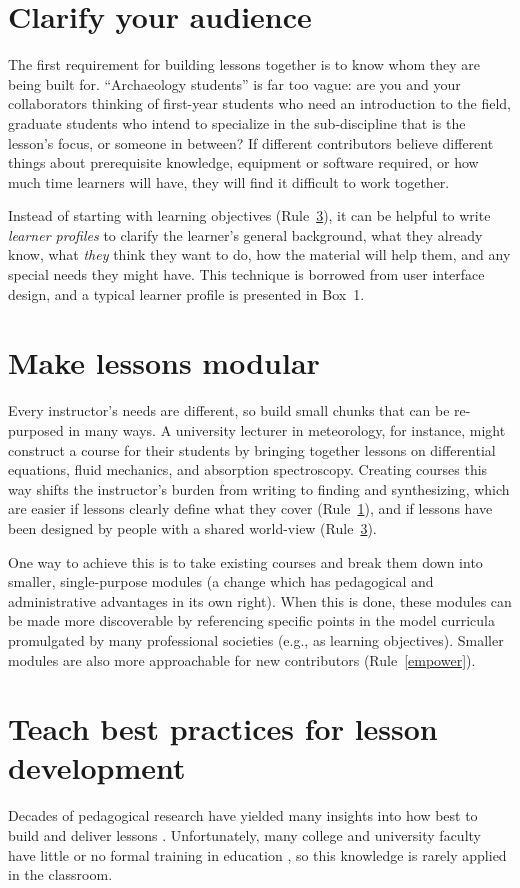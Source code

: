 \documentclass[10pt,letterpaper]{article}
\newcommand{\rulemajor}[2]{\section{#1}\label{#2}}
\newcommand{\ruleref}[1]{Rule~\ref{#1}}
\begin{document}
\rulemajor{Clarify your audience}{audience}

The first requirement for building lessons together is
to know whom they are being built for.
``Archaeology students'' is far too vague:
are you and your collaborators thinking of
first-year students who need an introduction to the field,
graduate students who intend to specialize in the sub-discipline that is the lesson's focus,
or someone in between?
If different contributors believe different things about prerequisite knowledge,
equipment or software required,
or how much time learners will have,
they will find it difficult to work together.

Instead of starting with learning objectives (\ruleref{practices}),
it can be helpful to write \emph{learner profiles} to clarify
the learner's general background,
what they already know,
what \emph{they} think they want to do,
how the material will help them,
and any special needs they might have.
This technique is borrowed from user interface design,
and a typical learner profile is presented in Box~1.

\rulemajor{Make lessons modular}{modular}

Every instructor's needs are different,
so build small chunks that can be re-purposed in many ways.
A university lecturer in meteorology,
for instance,
might construct a course for their students by bringing together lessons on differential equations,
fluid mechanics,
and absorption spectroscopy.
Creating courses this way shifts the instructor's burden from writing to finding and synthesizing,
which are easier if lessons clearly define what they cover (\ruleref{audience}),
and if lessons have been designed by people with a shared world-view (\ruleref{practices}).

One way to achieve this is to take existing courses and break them down into smaller, single-purpose modules
(a change which has pedagogical and administrative advantages in its own right).
When this is done,
these modules can be made more discoverable
by referencing specific points in the model curricula promulgated by many professional societies
(e.g., as learning objectives).
Smaller modules are also more approachable for new contributors (\ruleref{empower}).

\rulemajor{Teach best practices for lesson development}{practices}

Decades of pedagogical research have yielded many insights into
how best to build and deliver lessons \cite{hlw}.
Unfortunately,
many college and university faculty have little or no formal training in education \cite{brownell},
so this knowledge is rarely applied in the classroom.
\end{document}
